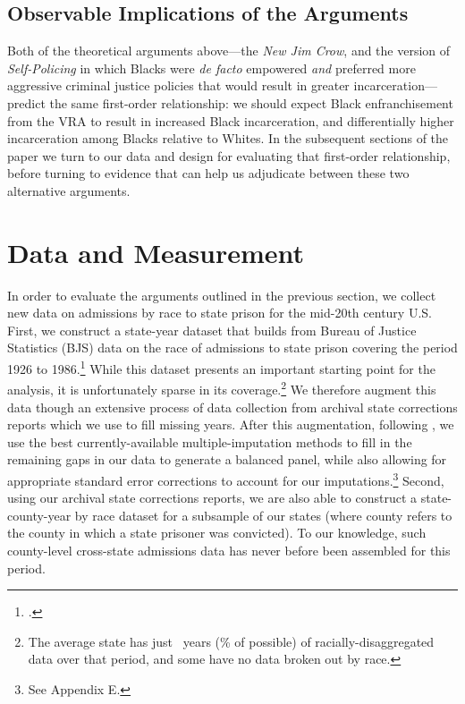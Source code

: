 \documentclass[12pt]{article}
\begin{document}
\subsection*{Observable Implications of the Arguments}

Both of the theoretical arguments above---the \emph{New Jim Crow}, and the version of \emph{Self-Policing} in which Blacks were \emph{de facto} empowered \emph{and} preferred more aggressive criminal justice policies that would result in greater incarceration---predict the same first-order relationship: we should expect Black enfranchisement from the VRA to result in increased Black incarceration, and differentially higher incarceration among Blacks relative to Whites.  In the subsequent sections of the paper we turn to our data and design for evaluating that first-order relationship, before turning to evidence that can help us adjudicate between these two alternative arguments.








\section*{Data and Measurement}

In order to evaluate the arguments outlined in the previous section, we collect new data on admissions by race to state prison for the mid-20th century U.S.  First, we construct a state-year dataset that builds from Bureau of Justice Statistics (BJS) data on the race of admissions to state prison covering the period 1926 to 1986.\footnote{\cite{RaceofPrisonersAd:1999ds}.}  While this dataset presents an important starting point for the analysis, it is unfortunately sparse in its coverage.\footnote{The average state has just \unskip~years (\unskip\% of possible) of racially-disaggregated data over that period, and some have no data broken out by race.}  We therefore augment this data though an extensive process of data collection from archival state corrections reports which we use to fill missing years. After this augmentation, following \cite{Honaker:2010wb}, we use the best currently-available multiple-imputation methods to fill in the remaining gaps in our data to generate a balanced panel, while also allowing for appropriate standard error corrections to account for our imputations.\footnote{See Appendix E.}  Second, using our archival state corrections reports, we are also able to construct a state-county-year by race dataset for a subsample of our states (where county refers to the county in which a state prisoner was convicted).  To our knowledge, such county-level cross-state admissions data has never before been assembled for this period.
\end{document}
